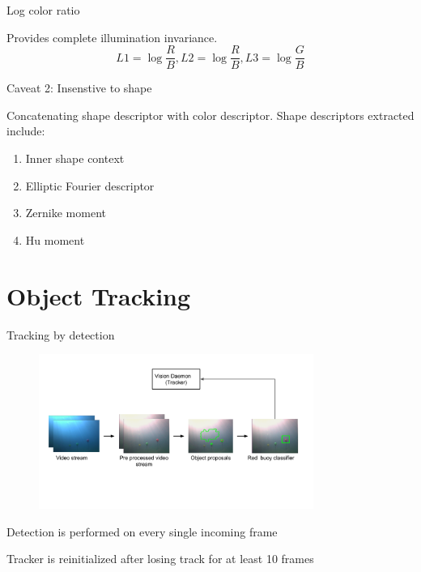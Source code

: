 \documentclass[14pt]{beamer}
\begin{document}
\begin{frame}{Log color ratio}

  Provides complete illumination invariance.
  \[
    L1 = \log{\frac{R}{B}}, L2 = \log{\frac{R}{B}}, L3 = \log{\frac{G}{B}}
  \]
\end{frame}

\begin{frame}{Caveat 2: Insenstive to shape}

  Concatenating shape descriptor with color descriptor. Shape descriptors
  extracted include:

  \begin{enumerate}
    \item Inner shape context
    \item Elliptic Fourier descriptor
    \item Zernike moment
    \item Hu moment
  \end{enumerate}

\end{frame}


\section{Object Tracking}

\begin{frame}{Tracking by detection}

  \begin{figure}[ht]
      \centering
      \includegraphics[width=0.8\textwidth, height=0.4\textwidth]{figs/tracker.png}
  \end{figure}

  \begin{enumerate}
    {\small \item Detection is performed on every single incoming frame}
    {\small \item Tracker is reinitialized after losing track for at least 10 frames}
  \end{enumerate}
\end{frame}
\end{document}
